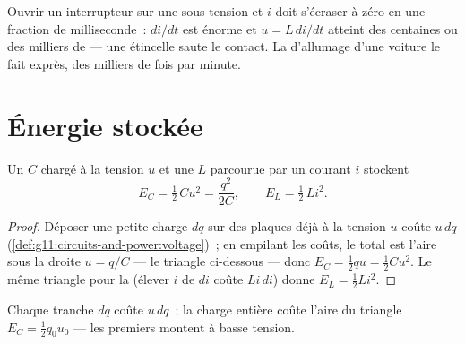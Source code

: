 \begin{remark}\label{rem:g12:rc-rl-circuits:spark}
Ouvrir un interrupteur sur une  sous tension et $i$
doit s'écraser à zéro en une fraction de milliseconde~: $di/dt$ est
énorme et $u = L\,di/dt$ atteint des centaines ou des milliers de
 --- une étincelle saute le contact. La
 d'allumage d'une voiture le fait exprès, des
milliers de fois par minute.
\end{remark}

\section{Énergie stockée}

\begin{proposition}\label{prop:g12:rc-rl-circuits:energy}
Un  $C$ chargé à la
tension $u$ et une  $L$
parcourue par un courant $i$ stockent
\[
E_C = \tfrac12\,C u^2 = \frac{q^2}{2C},
\qquad
E_L = \tfrac12\,L i^2 .
\]
\end{proposition}

\begin{proof}
Déposer une petite charge $dq$ sur des plaques déjà à la
tension $u$ coûte $u\,dq$
(\cref{def:g11:circuits-and-power:voltage})~; en empilant les coûts, le
total est l'aire sous la droite $u = q/C$ --- le triangle ci-dessous
--- donc $E_C = \tfrac12 qu = \tfrac12 Cu^2$. Le même triangle pour
la  (élever $i$ de $di$ coûte $Li\,di$) donne
$E_L = \tfrac12 Li^2$.
\end{proof}

\begin{omfigure}

{\small Chaque tranche $dq$ coûte $u\,dq$~; la charge entière coûte
l'aire du triangle $E_C = \tfrac12 q_0 u_0$ --- les premiers
 montent à basse
tension.}
\end{omfigure}


